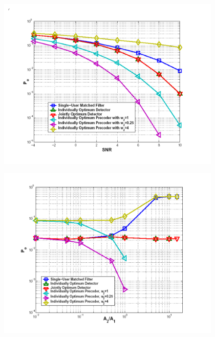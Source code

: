 \documentclass[20pt,landscape]{foils}
\begin{document}
\begin{figure}
\begin{center}
\includegraphics[width=8.0in]{Opt_BER.pdf}
\end{center}
\end{figure}


\begin{figure}
\begin{center}
\includegraphics[width=8.0in]{Opt_NFR.pdf}
\end{center}
\end{figure}


\foilhead{}
\end{document}
